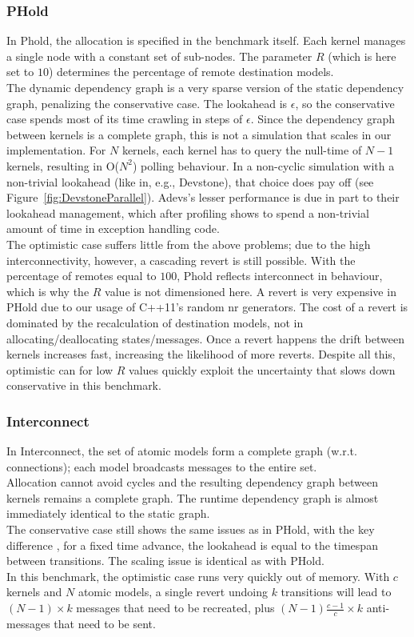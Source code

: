 \subsubsection{PHold}
In Phold, the allocation is specified in the benchmark itself. Each kernel manages a single node with a constant set of sub-nodes. The parameter $R$ (which is here set to $10$) determines the percentage of remote destination models.\\
The dynamic dependency graph is a very sparse version of the static dependency graph, penalizing the conservative case. The lookahead is $\epsilon$, so the conservative case spends most of its time crawling in steps of $\epsilon$. Since the dependency graph between kernels is a complete graph, this is not a simulation that scales in our implementation. For $N$ kernels, each kernel has to query the null-time of $N-1$ kernels, resulting in O($N^2$) polling behaviour. In a non-cyclic simulation with a non-trivial lookahead (like in, e.g., Devstone), that choice does pay off (see Figure~\ref{fig:DevstoneParallel}). Adevs's lesser performance is due in part to their lookahead management, which after profiling shows to spend a non-trivial amount of time in exception handling code.\\
The optimistic case suffers little from the above problems; due to the high interconnectivity, however, a cascading revert is still possible. With the percentage of remotes equal to $100$, Phold reflects interconnect in behaviour, which is why the $R$ value is not dimensioned here. A revert is very expensive in PHold due to our usage of C++11's random nr generators. The cost of a revert is dominated by the recalculation of destination models, not in allocating/deallocating states/messages. Once a revert happens the drift between kernels increases fast, increasing the likelihood of more reverts. Despite all this, optimistic can for low $R$ values quickly exploit the uncertainty that slows down conservative in this benchmark.

\subsubsection{Interconnect}
In Interconnect, the set of atomic models form a complete graph (w.r.t. connections); each model broadcasts messages to the entire set.\\
Allocation cannot avoid cycles and the resulting dependency graph between kernels remains a complete graph. The runtime dependency graph is almost immediately identical to the static graph.\\
The conservative case still shows the same issues as in PHold, with the key difference , for a fixed time advance, the lookahead is equal to the timespan between transitions. The scaling issue is identical as with PHold.\\
In this benchmark, the optimistic case runs very quickly out of memory. With $c$ kernels and $N$ atomic models, a single revert undoing $k$ transitions will lead to $(N-1)\times k$ messages that need to be recreated, plus $(N-1) \frac{c-1}{c} \times k$ anti-messages that need to be sent.

